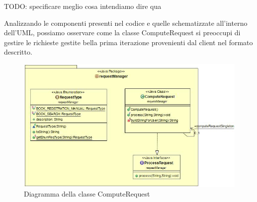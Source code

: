 TODO: specificare meglio cosa intendiamo dire qua


Analizzando le componenti presenti nel codice e quelle schematizzate all'interno dell'UML, possiamo osservare come la classe ComputeRequest si preoccupi di gestire le richieste gestite bella prima iterazione provenienti dal client nel formato descritto.

\begin{figure}[h!]
	\includegraphics[width=\textwidth]{Immagini/UML_ComputeRequestServer}
	\caption{Diagramma della classe ComputeRequest}
	\label{fig:Diagramma della class ComputeRequest}
\end{figure}
